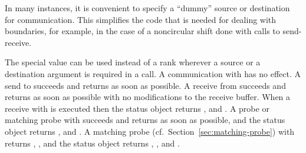 In many instances, it is convenient to specify a ``dummy'' source or
destination
for communication.  This simplifies the code that is needed for dealing with
boundaries, for example, in the case of a noncircular shift done with calls to
send-receive.

The special value  can be used
instead of a rank wherever a
source or a destination argument is required in a call.  A communication
with  has no effect.
A send to 
succeeds and returns as soon as possible.
A receive from  succeeds and
returns as soon as possible with no modifications to the receive buffer.
When a receive with \mpicode{ = } is executed then
the status object returns \mpicode{ = },
\mpicode{ = } and
.
A probe or matching probe with \mpicode{ = } succeeds and
returns as soon as possible, and the status object returns
\mpicode{ = },
\mpicode{ = } and
.
A matching probe (cf.~Section~\ref{sec:matching-probe}) with
\mpicode{ = } returns \mpicode{ = },
\mpicode{ = }, and the status object returns
\mpicode{ = }, \mpicode{ = }, and
.

